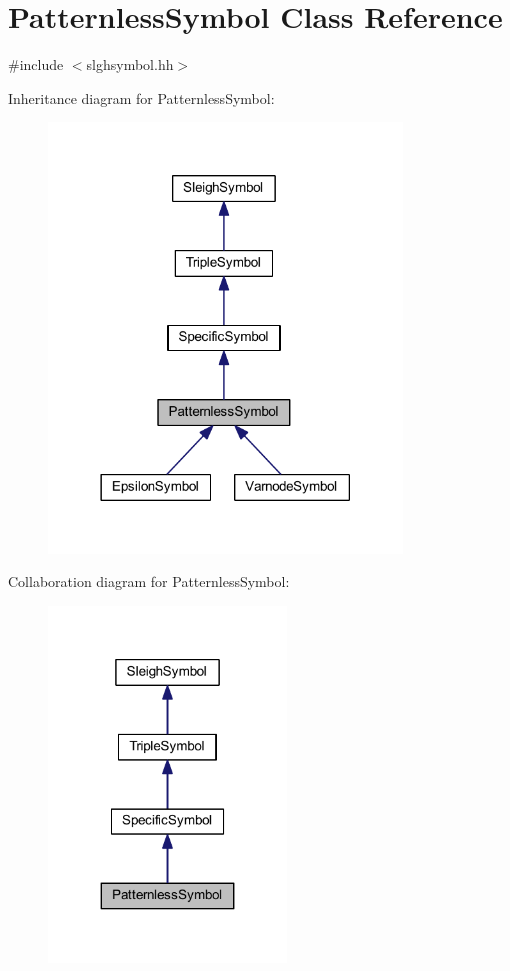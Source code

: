 \hypertarget{class_patternless_symbol}{}\section{Patternless\+Symbol Class Reference}
\label{class_patternless_symbol}


{\ttfamily \#include $<$slghsymbol.\+hh$>$}



Inheritance diagram for Patternless\+Symbol\+:
\nopagebreak
\begin{figure}[H]
\begin{center}
\leavevmode
\includegraphics[width=266pt]{class_patternless_symbol__inherit__graph}
\end{center}
\end{figure}


Collaboration diagram for Patternless\+Symbol\+:
\nopagebreak
\begin{figure}[H]
\begin{center}
\leavevmode
\includegraphics[width=179pt]{class_patternless_symbol__coll__graph}
\end{center}
\end{figure}
